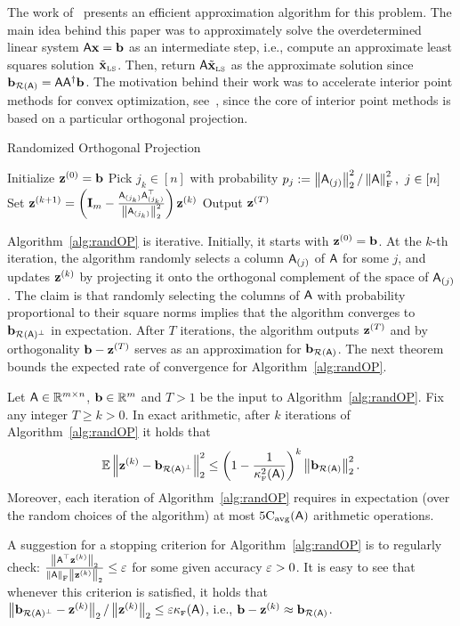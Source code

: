 %
The work of~\cite{ROP:CRT11} presents an efficient approximation algorithm for this problem. The main idea behind this paper was to approximately solve the overdetermined linear system ${\mathsf{A} } \mathbf{x} = {\mathbf b}$ as an intermediate step, i.e., compute an approximate least squares solution $\tilde{\mathbf{x}}_{\textrm{\tiny LS}}$. Then, return ${\mathsf{A} } \tilde{\mathbf{x}}_{\textrm{\tiny LS}}$ as the approximate solution since ${{\mathbf b}_{\mathcal{R}({\mathsf{A} }) } }={\mathsf{A} }{{\mathsf{A} }}^\dagger{\mathbf b}$. The motivation behind their work was to accelerate interior point methods for convex optimization, see~\cite{book:Wright}, since the core of interior point methods is based on a particular orthogonal projection.
%
\begin{algorithm}{}
	\caption{Randomized Orthogonal Projection}\label{alg:randOP}
\begin{algorithmic}[1]
\State Initialize $\mathbf{z}^{(0)} ={\mathbf b}$
	\State Pick $j_k\in[n]$ with probability $p_j:=\left\|{\mathsf{A} }_{(j)}\right\|_2^2/\left\|{\mathsf{A} }\right\|_{\textrm{F}}^2,\ j\in [n]$
	\State Set $ \mathbf{z}^{(k+1)} = \left(\mathbf{I}_m - \frac{{\mathsf{A} }_{(j_k)} {\mathsf{A} }_{(j_k)}^\top }{\left\|{\mathsf{A} }_{(j_k)}\right\|_2^2}\right) \mathbf{z}^{(k)}$
\EndFor
\State Output $\mathbf{z}^{(T)}$
\EndProcedure
\end{algorithmic}
\end{algorithm}
%
Algorithm~\ref{alg:randOP} is iterative. Initially, it starts with $\mathbf{z}^{(0)}={\mathbf b}$. At the $k$-th iteration, the algorithm randomly selects a column ${\mathsf{A} }_{(j)}$ of ${\mathsf{A} }$ for some $j$, and updates $\mathbf{z}^{(k)}$ by projecting it onto the orthogonal complement of the space of ${\mathsf{A} }_{(j)}$. The claim is that randomly selecting the columns of ${\mathsf{A} }$ with probability proportional to their square norms implies that the algorithm converges to ${{\mathbf b}_{\mathcal{R}({\mathsf{A} })^\bot } }$ in expectation. After $T$ iterations, the algorithm outputs $\mathbf{z}^{(T)}$ and by orthogonality ${\mathbf b}-\mathbf{z}^{(T)}$ serves as an approximation for ${{\mathbf b}_{\mathcal{R}({\mathsf{A} }) } }$. The next theorem bounds the expected rate of convergence for Algorithm~\ref{alg:randOP}.
%
%
\begin{theorem}\label{thm:randOP}
Let ${\mathsf{A} }\in\mathbb{R}^{m\times n}$, ${\mathbf b}\in\mathbb{R}^m$ and $T>1$ be the input to Algorithm~\ref{alg:randOP}. Fix any integer $T\geq k>0$. In exact arithmetic, after $k$ iterations of Algorithm~\ref{alg:randOP} it holds that
\[\operatorname{\mathbb{E}} \left\|\mathbf{z}^{(k)} - {{\mathbf b}_{\mathcal{R}({\mathsf{A} })^\bot } } \right\|_2^2 \leq \left(1 -\frac1{\kappa^2_{\textrm{\tiny F}}({\mathsf{A} })}\right)^k  \left\|{{\mathbf b}_{\mathcal{R}({\mathsf{A} }) } }\right\|_2^2.\]
Moreover, each iteration of Algorithm~\ref{alg:randOP} requires in expectation (over the random choices of the algorithm) at most $5\mathrm{C}_{\mathrm{avg}}({\mathsf{A} })$ arithmetic operations.
\end{theorem}
\begin{remark}\label{rem:randOP}
A suggestion for a stopping criterion for Algorithm~\ref{alg:randOP} is to regularly check: $ \frac{\left\|{\mathsf{A} }^\top \mathbf{z}^{(k)}\right\|_2}{\left\|{\mathsf{A} }\right\|_{\textrm{F}} \left\|\mathbf{z}^{(k)}\right\|_2} \leq \varepsilon$ for some given accuracy $\varepsilon>0$. It is easy to see that whenever this criterion is satisfied, it holds that $\left\|{{\mathbf b}_{\mathcal{R}({\mathsf{A} })^\bot } }-\mathbf{z}^{(k)} \right\|_2 / \left\|\mathbf{z}^{(k)}\right\|_2 \leq \varepsilon \kappa_{\textrm{\tiny F}}({\mathsf{A} })$, i.e., ${\mathbf b}-\mathbf{z}^{(k)}\approx {{\mathbf b}_{\mathcal{R}( {\ensuremath{\mathsf{A} }}) } }$.
\end{remark}
%

